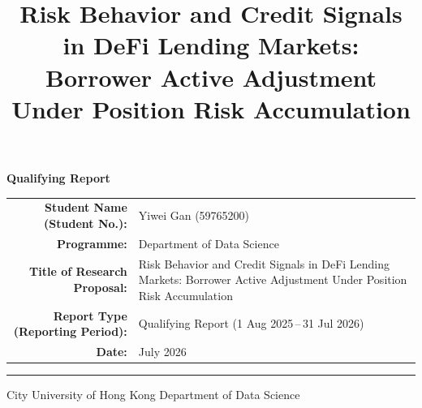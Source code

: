 \documentclass[12pt,a4paper]{article}
\begin{document}
\thispagestyle{empty}
\begin{center}

\vspace*{2cm}

{\large\textbf{Qualifying Report}}

\vspace{2.5cm}

\begin{tabular}{r@{\hskip 6pt}l}
\textbf{Student Name (Student No.):} & Yiwei Gan (59765200) \\[8pt]
\textbf{Programme:} & Department of Data Science \\[8pt]
\textbf{Title of Research Proposal:} & \parbox[t]{9cm}{\raggedright\small Risk Behavior and Credit Signals in DeFi Lending Markets: Borrower Active Adjustment Under Position Risk Accumulation} \\[8pt]
\textbf{Report Type (Reporting Period):} & Qualifying Report (1 Aug 2025\,--\,31 Jul 2026) \\[8pt]
\textbf{Date:} & July 2026
\end{tabular}

\vfill
\rule{\textwidth}{0.5pt}
\footnotesize City University of Hong Kong \hspace{1cm} Department of Data Science

\end{center}

\newpage

\title{\vspace{-1.5cm} \textbf{Risk Behavior and Credit Signals in DeFi Lending Markets:}\\\large{Borrower Active Adjustment Under Position Risk Accumulation}}
\author{}
\date{}

\maketitle
\thispagestyle{empty}


\newpage
\tableofcontents
\newpage


\newpage

\newpage


\newpage

\newpage

\newpage


\end{document}
